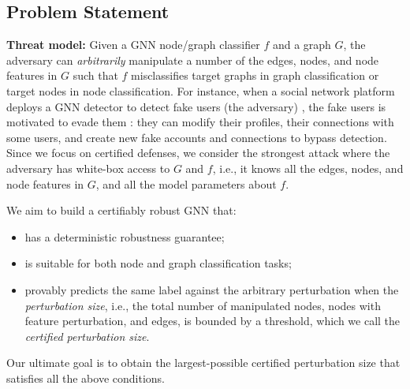 \subsection{Problem Statement}
\label{sec:problem}

{\bf Threat model:} Given a GNN node/graph classifier $f$ and a graph $G$, the adversary can \emph{arbitrarily} manipulate a number of the edges, nodes, and node features in $G$ such that $f$ misclassifies target graphs in graph classification or target nodes in node classification. 
{For instance, when a social network platform deploys a GNN detector to detect fake users (the adversary) \cite{wang2017gang,xu2022evidence}, the fake users is motivated to evade them \cite{wang2019attacking}: they can modify their profiles,
their connections with some users, and create new fake accounts and connections to bypass detection.}
Since we focus on certified defenses, we consider the strongest attack where the adversary has white-box access to $G$ and $f$, i.e., it knows all the edges, nodes, and node features in $G$, and all the model parameters about $f$.


\vspace{+0.05in}
We aim to build a certifiably robust GNN that: 
\begin{itemize}[leftmargin=*]
\vspace{-2mm}
\item  has a deterministic robustness guarantee; 
\vspace{-2mm}
\item is suitable for both node and graph classification tasks; 
\vspace{-2mm}
\item provably predicts the same label against the arbitrary perturbation when the \emph{perturbation size}, i.e., the total number of manipulated nodes, nodes with feature perturbation, and edges, is bounded by a threshold, which we call the \emph{certified perturbation size}. 
\vspace{-2mm}
\end{itemize}

Our ultimate goal is to obtain the largest-possible certified perturbation size that satisfies all the above conditions.


